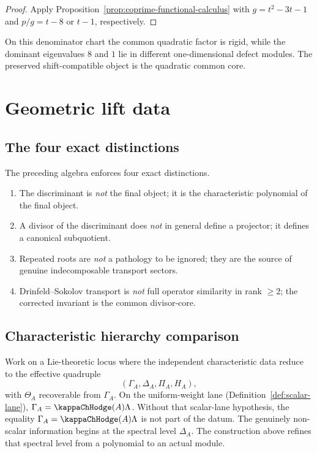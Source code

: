 \begin{proof}
Apply Proposition~\ref{prop:coprime-functional-calculus} with \(g=t^2-3t-1\) and \(p/g=t-8\) or \(t-1\), respectively.
\end{proof}

\begin{remark}
On this denominator chart the common quadratic factor is rigid, while the
dominant eigenvalues \(8\) and \(1\) lie in different one-dimensional
defect modules.
The preserved shift-compatible object is the quadratic common core.
\end{remark}

\section{Geometric lift data}

\subsection{The four exact distinctions}

The preceding algebra enforces four exact distinctions.

\begin{enumerate}[label=\textup{(\arabic*)}]
\item The discriminant is \emph{not} the final object; it is the characteristic polynomial of the final object.

\item A divisor of the discriminant does \emph{not} in general define a projector; it defines a canonical subquotient.

\item Repeated roots are \emph{not} a pathology to be ignored; they are the source of genuine indecomposable transport sectors.

\item Drinfeld--Sokolov transport is \emph{not} full operator similarity in rank \(\ge 2\); the corrected invariant is the common divisor-core.
\end{enumerate}

\subsection{Characteristic hierarchy comparison}

Work on a Lie-theoretic locus where the independent characteristic data reduce to the effective quadruple
\[
(\Gamma_A,\Delta_A,\Pi_A,H_A),
\]
with \(\Theta_A\) recoverable from \(\Gamma_A\). On the
uniform-weight lane (Definition~\ref{def:scalar-lane}),
\(\Gamma_A = \kappaChHodge(A)\Lambda\). Without that scalar-lane hypothesis,
the equality \(\Gamma_A=\kappaChHodge(A)\Lambda\) is not part of the datum. The genuinely
non-scalar information begins at the spectral level \(\Delta_A\).
The construction above refines that spectral level from a polynomial to an actual module.

